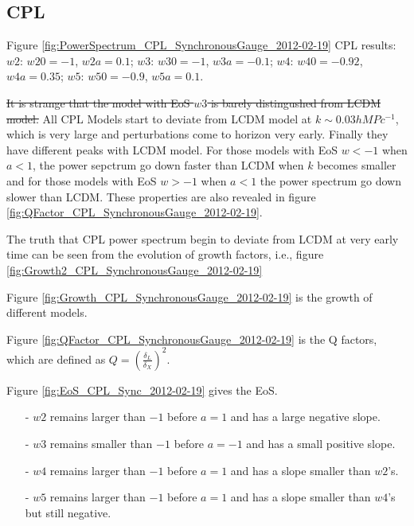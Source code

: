 \documentclass{article}
\begin{document}
{\color{blue}

\subsection{CPL}




Figure \ref{fig:PowerSpectrum_CPL_SynchronousGauge_2012-02-19} CPL results: $w2$: $w20=-1$, $w2a=0.1$; $w3$: $w30=-1$, $w3a=-0.1$; $w4$: $w40=-0.92$, $w4a=0.35$; $w5$: $w50=-0.9$, $w5a=0.1$.

\sout{It is strange that the model with EoS $w3$ is barely distingushed from LCDM model.} All CPL Models start to deviate from LCDM model at $k\sim 0.03 h MPc^{-1}$, which is very large and perturbations come to horizon very early. Finally they have different peaks with LCDM model. For those models with EoS $w<-1$ when $a<1$, the power sepctrum go down faster than LCDM when $k$ becomes smaller and for those models with EoS $w>-1$ when $a<1$ the power spectrum go down slower than LCDM. These properties are also revealed in figure \ref{fig:QFactor_CPL_SynchronousGauge_2012-02-19}.

The truth that CPL power spectrum begin to deviate from LCDM at very early time can be seen from the evolution of growth factors, i.e., figure \ref{fig:Growth2_CPL_SynchronousGauge_2012-02-19}


Figure \ref{fig:Growth_CPL_SynchronousGauge_2012-02-19} is the growth of different models.

Figure \ref{fig:QFactor_CPL_SynchronousGauge_2012-02-19} is the Q factors, which are defined as $Q=(\frac{\delta_L}{\delta_X})^2$.

Figure \ref{fig:EoS_CPL_Sync_2012-02-19} gives the EoS.
\begin{itemize}
\item[-]
$w2$ remains larger than $-1$ before $a=1$ and has a large negative slope.
\item[-]
$w3$ remains smaller than $-1$ before $a=-1$ and has a small positive slope.
\item[-]
$w4$ remains larger than $-1$ before $a=1$ and has a slope smaller than $w2$'s.
\item[-]
$w5$ remains larger than $-1$ before $a=1$ and has a slope smaller than $w4$'s but still negative.
\end{itemize}



}
\end{document}
